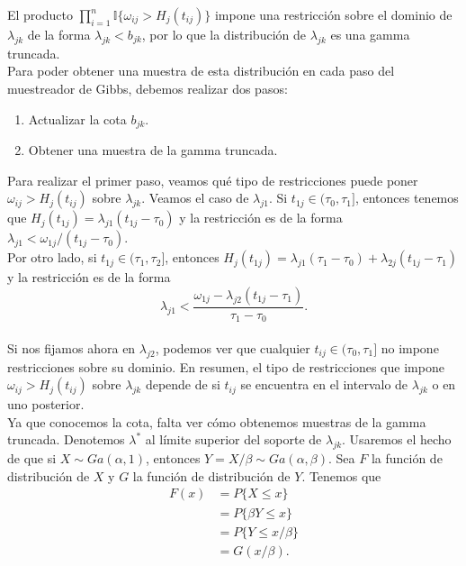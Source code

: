 \documentclass[11pt,a4paper]{article}
\begin{document}
El producto $\prod_{i=1}^n \mathbb{I}\lbrace \omega_{ij} > H_j(t_{ij}) \rbrace$ impone una restricción sobre el dominio de $\lambda_{jk}$ de la forma $\lambda_{jk} < b_{jk}$, por lo que la distribución de $\lambda_{jk}$ es una gamma truncada.\\

Para poder obtener una muestra de esta distribución en cada paso del muestreador de Gibbs, debemos realizar dos pasos:
\begin{enumerate}
\item Actualizar la cota $b_{jk}.$
\item Obtener una muestra de la gamma truncada.\\
\end{enumerate}

Para realizar el primer paso, veamos qué tipo de restricciones puede poner $\omega_{ij} > H_j(t_{ij})$ sobre $\lambda_{jk}$. Veamos el caso de $\lambda_{j1}$. Si $t_{1j} \in (\tau_0, \tau_1]$, entonces tenemos que $H_j(t_{1j}) = \lambda_{j1}(t_{1j} - \tau_0)$ y la restricción es de la forma $\lambda_{j1} < \omega_{1j} / (t_{1j} - \tau_0)$.\\

Por otro lado, si $t_{1j} \in (\tau_1, \tau_2]$, entonces $H_j(t_{1j}) = \lambda_{j1}(\tau_1 - \tau_0) + \lambda_{2j}(t_{1j} - \tau_1)$ y la restricción es de la forma $$\lambda_{j1} < \frac{\omega_{1j}-\lambda_{j2}(t_{1j} - \tau_1)}{\tau_1 - \tau_0}.$$\\

Si nos fijamos ahora en $\lambda_{j2}$, podemos ver que cualquier $t_{ij} \in (\tau_0, \tau_1]$ no impone restricciones sobre su dominio. En resumen, el tipo de restricciones que impone $\omega_{ij} > H_j(t_{ij})$ sobre $\lambda_{jk}$ depende de si $t_{ij}$ se encuentra en el intervalo de $\lambda_{jk}$ o en uno posterior.\\

Ya que conocemos la cota, falta ver cómo obtenemos muestras de la gamma truncada. Denotemos $\lambda^*$ al límite superior del soporte de $\lambda_{jk}$. Usaremos el hecho de que si $X \sim Ga(\alpha, 1)$, entonces $Y = X/\beta \sim Ga(\alpha, \beta)$. Sea $F$ la función de distribución de $X$ y $G$ la función de distribución de $Y$. Tenemos que
\begin{align*}
F(x) &= P\lbrace X \leq x\rbrace\\
&= P\lbrace \beta Y \leq x \rbrace\\
&= P\lbrace Y \leq x/\beta \rbrace\\
&= G(x/\beta).\\
\end{align*}
\end{document}
